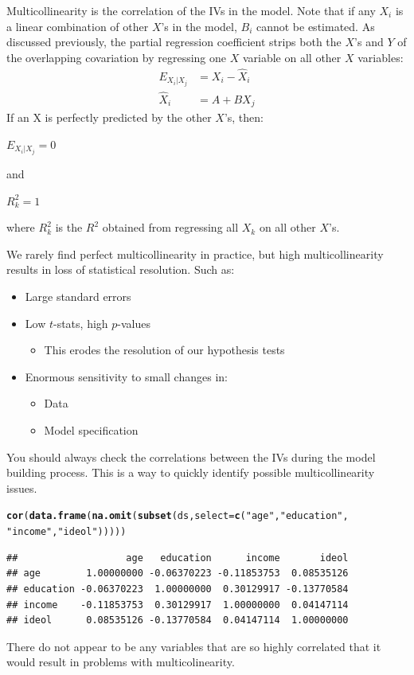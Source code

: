 \documentclass[11pt,openany]{book}\usepackage[]{graphicx}\usepackage[]{color}
\makeatletter
\newcommand{\hlstr}[1]{\textcolor[rgb]{0.192,0.494,0.8}{#1}}%
\newcommand{\hlstd}[1]{\textcolor[rgb]{0.345,0.345,0.345}{#1}}%
\newcommand{\hlkwc}[1]{\textcolor[rgb]{0.333,0.667,0.333}{#1}}%
\newcommand{\hlkwd}[1]{\textcolor[rgb]{0.737,0.353,0.396}{\textbf{#1}}}%
\newenvironment{kframe}{%
 \def\at@end@of@kframe{}%
 \ifinner\ifhmode%
  \def\at@end@of@kframe{\end{minipage}}%
  \begin{minipage}{\columnwidth}%
 \fi\fi%
 \def\FrameCommand##1{\hskip\@totalleftmargin \hskip-\fboxsep
 \colorbox{shadecolor}{##1}\hskip-\fboxsep
     \hskip-\linewidth \hskip-\@totalleftmargin \hskip\columnwidth}%
 \MakeFramed {\advance\hsize-\width
   \@totalleftmargin\z@ \linewidth\hsize
   \@setminipage}}%
 {\par\unskip\endMakeFramed%
 \at@end@of@kframe}
\newenvironment{knitrout}{}{} %
\renewenvironment{knitrout}{\begin{singlespace}}{\end{singlespace}}
\makeatother
\begin{document}
Multicollinearity is the correlation of the IVs in the model. Note that if any $X_i$ is a linear combination of other $X$'s in the model, $B_i$ cannot be estimated. As discussed previously, the partial regression coefficient strips both the $X$'s and $Y$ of the overlapping covariation by regressing one $X$ variable on all other $X$ variables: 
\begin{align*}
  E_{X_{i}|X_{j}} &= X_i - \hat{X}_i \\
  \hat{X}_i &= A + BX_j 
\end{align*}
If an X is perfectly predicted by the other $X$'s, then:
\begin{center}
  $E_{X_{i}|X_{j}}=0$ 
  
  and 
  
  $R^2_k=1$
\end{center}
\noindent where $R^2_k$ is the $R^2$ obtained from regressing all
$X_k$ on all other $X$'s. 

We rarely find perfect multicollinearity in practice, but high multicollinearity results in loss of statistical resolution. Such as:  
\begin{itemize}
\item Large standard errors
\item Low $t$-stats, high $p$-values
  \begin{itemize}
\item This erodes the resolution of our hypothesis tests
  \end{itemize}
\item Enormous sensitivity to small changes in:
  \begin{itemize}
\item Data
\item Model specification
  \end{itemize}
  \end{itemize}

You should always check the correlations between the IVs during the model building process. This is a way to quickly identify possible multicollinearity issues.
\begin{knitrout}
\color{fgcolor}\begin{kframe}
\begin{alltt}
\hlkwd{cor}\hlstd{(}\hlkwd{data.frame}\hlstd{(}\hlkwd{na.omit}\hlstd{(}\hlkwd{subset}\hlstd{(ds,} \hlkwc{select} \hlstd{=} \hlkwd{c}\hlstd{(}\hlstr{"age"}\hlstd{,} \hlstr{"education"}\hlstd{,}
    \hlstr{"income"}\hlstd{,} \hlstr{"ideol"}\hlstd{)))))}
\end{alltt}
\begin{verbatim}
##                   age   education      income       ideol
## age        1.00000000 -0.06370223 -0.11853753  0.08535126
## education -0.06370223  1.00000000  0.30129917 -0.13770584
## income    -0.11853753  0.30129917  1.00000000  0.04147114
## ideol      0.08535126 -0.13770584  0.04147114  1.00000000
\end{verbatim}
\end{kframe}
\end{knitrout}
\noindent There do not appear to be any variables that are so highly correlated that it would result in problems with multicolinearity. 
\end{document}
